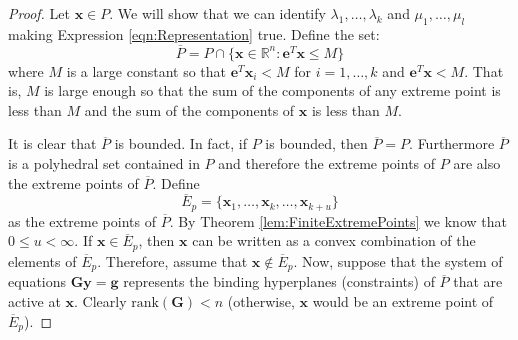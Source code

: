 \begin{proof}
Let $\mathbf{x} \in P$. We will show that we can identify $\lambda_1,\dots,\lambda_k$ and $\mu_1,\dots,\mu_l$ making Expression \ref{eqn:Representation} true. Define the set:
\begin{equation}
\overline{P} = P \cap \{\mathbf{x} \in \mathbb{R}^n : \mathbf{e}^T\mathbf{x} \leq M\}
\end{equation}
where $M$ is a large constant so that $\mathbf{e}^T\mathbf{x}_i < M$ for $i=1,\dots,k$ and $\mathbf{e}^T\mathbf{x} < M$. That is, $M$ is large enough so that the sum of the components of any extreme point is less than $M$ and the sum of the components of $\mathbf{x}$ is less than $M$.

It is clear that $\overline{P}$ is bounded. In fact, if $P$ is bounded, then $\overline{P} = P$. Furthermore $\overline{P}$ is a polyhedral set contained in $P$ and therefore the extreme points of $P$ are also the extreme points of $\overline{P}$. Define 
\begin{displaymath}
\overline{E}_p = \{\mathbf{x}_1,\dots,\mathbf{x}_k,\dots,\mathbf{x}_{k+u}\}
\end{displaymath}
as the extreme points of $\overline{P}$. By Theorem \ref{lem:FiniteExtremePoints} we know that $0 \leq u < \infty$. If $\mathbf{x} \in \overline{E}_p$, then $\mathbf{x}$ can be written as a convex combination of the elements of $\overline{E}_p$. Therefore, assume that $\mathbf{x} \not\in \overline{E}_p$. Now, suppose that the system of equations $\mathbf{G}\mathbf{y} = \mathbf{g}$ represents the binding hyperplanes (constraints) of $\overline{P}$ that are active at $\mathbf{x}$. Clearly $\mathrm{rank}(\mathbf{G}) < n$ (otherwise, $\mathbf{x}$ would be an extreme point of $\overline{E}_p$).


\end{proof}
